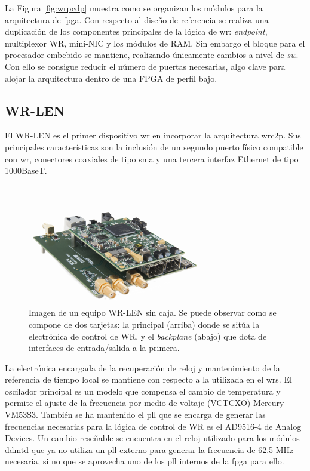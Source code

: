 La Figura \ref{fig:wrpcdp} muestra como se organizan los módulos para la 
arquitectura de \gls{fpga}. Con respecto al diseño de referencia se realiza una 
duplicación de los componentes principales de la lógica de \gls{wr}: 
\textit{endpoint}, multiplexor WR, mini-NIC
y los módulos de RAM. Sin embargo el bloque para el procesador embebido se 
mantiene, realizando únicamente cambios a nivel de \textit{sw}. Con ello se 
consigue reducir el número de puertas necesarias, algo clave para alojar la 
arquitectura dentro de una FPGA de perfil bajo.

\subsection{WR-LEN}

El WR-LEN es el primer dispositivo \gls{wr} en incorporar la arquitectura 
\gls{wrc2p}. Sus principales características son la inclusión de un segundo 
puerto físico compatible con \gls{wr}, conectores coaxiales de tipo \gls{sma} y 
una tercera interfaz Ethernet de tipo 1000BaseT.

\begin{figure}
	\centering
	\includegraphics[width=0.7\linewidth]{imagenes/wrlen}
	\caption[WR-LEN en su versión para desarrolladores]{Imagen de un equipo 
	WR-LEN sin caja. Se puede observar como se compone de dos tarjetas: la 
	principal (arriba) donde se sitúa la electrónica de control de WR, y el 
	\textit{backplane} (abajo) que dota de interfaces de entrada/salida a la 
	primera.}
	\label{fig:wrlen}
\end{figure}


La electrónica encargada de la recuperación de reloj y mantenimiento de la 
referencia de tiempo local se mantiene con respecto a la utilizada en el 
\gls{wrs}. El oscilador principal es un modelo que compensa el cambio de 
temperatura y permite el ajuste de la frecuencia por medio de voltaje (VCTCXO) 
Mercury VM53S3. También se ha mantenido el \gls{pll} que se encarga de generar 
las frecuencias necesarias para la lógica de control de WR es el AD9516-4 de 
Analog Devices. Un cambio reseñable se encuentra en el reloj utilizado 
para los módulos 
\gls{ddmtd} que ya no utiliza un \gls{pll} externo para generar la frecuencia 
de 62.5 MHz necesaria, si no que se aprovecha uno de los \gls{pll} internos de 
la \gls{fpga} para ello.

